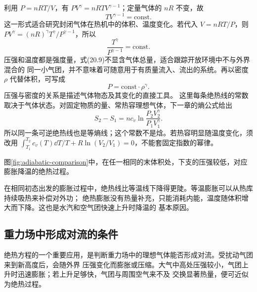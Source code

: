 利用 $P=nRT/V$，有 $PV^\gamma=nRTV^{\gamma-1}$；定量气体的 $nR$ 不变，故
\begin{equation}
  \boxed{TV^{\gamma-1}=\mathrm{const}}. \tag{20.8}
\end{equation}
这一形式适合研究封闭气体在热机中的体积、温度变化。若代入 $V=nRT/P$，则
$PV^\gamma=(nR)^\gamma T^\gamma/P^{\gamma-1}$，所以
\begin{equation}
  \boxed{\frac{T^\gamma}{P^{\gamma-1}}=\mathrm{const}}. \tag{20.9}
\end{equation}
压强和温度都是强度量，式(20.9)不显含气体总量，适合跟踪开放环境中不与外界混合的
同一小气团，并不意味着可随意用于有质量流入、流出的系统。再以密度
$\rho$ 代替体积，可写成
\begin{equation}
  \boxed{P=\mathrm{const}\cdot\rho^\gamma}. \tag{20.10}
\end{equation}
压强与密度的关系是描述气体物态及其变化的直接工具。
这里每条绝热线的常数取决于气体状态。对固定物质的量、常热容理想气体，下一章的熵公式给出
\[
 S_2-S_1=n c_v\ln\frac{P_2V_2^\gamma}{P_1V_1^\gamma}.
\]
所以同一条可逆绝热线也是等熵线；这个常数不是焓。若热容明显随温度变化，须改用
$\int_{T_1}^{T_2}c_v(T)\dd T/T+R\ln(V_2/V_1)=0$，不能套固定指数的幂律。

\adiabaticCurvesDiagram
{}\label{fig:adiabatic-comparison}
图\ref{fig:adiabatic-comparison}中，在任一相同的末体积处，下支的压强较低，对应膨胀降温的绝热过程。

在相同初态出发的膨胀过程中，绝热线比等温线下降得更陡。等温膨胀可以从热库持续吸热来补偿对外功；
绝热膨胀没有热量补充，只能消耗内能，温度随体积增大而下降。这也是水汽和空气团快速上升时降温的
基本原因。

\subsection*{重力场中形成对流的条件}

绝热方程的一个重要应用，是判断重力场中的理想气体能否形成对流。受扰动气团来到新高度后，会随外界
压强变化而膨胀或压缩。大气中高处压强较小，气团上升时迅速膨胀；若上升足够快，气团与周围空气来不及
交换显著热量，便可近似为绝热过程。

